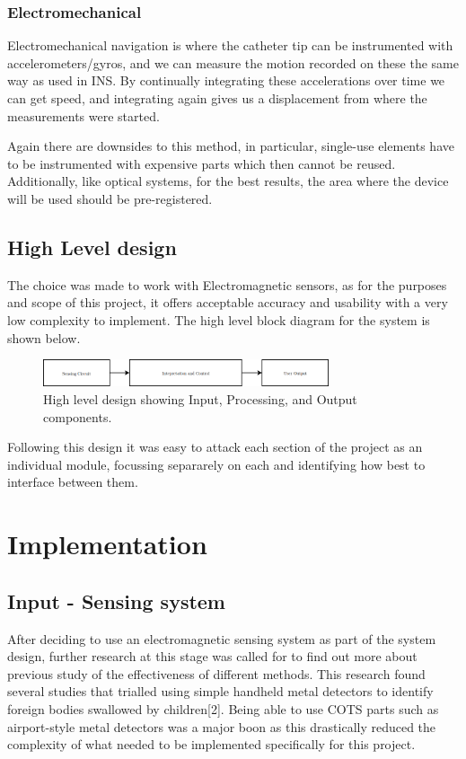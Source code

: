 \documentclass[a4paper]{article}
\begin{document}
            \subsubsection{Electromechanical}
            Electromechanical navigation is where the catheter tip can be instrumented with accelerometers/gyros, and we can measure the motion recorded on these the same way as used in INS. By continually integrating these accelerations over time we can get speed, and integrating again gives us a displacement from where the measurements were started.

            Again there are downsides to this method, in particular, single-use elements have to be instrumented with expensive parts which then cannot be reused. Additionally, like optical systems, for the best results, the area where the device will be used should be pre-registered.

        \subsection{High Level design}
        The choice was made to work with Electromagnetic sensors, as for the purposes and scope of this project, it offers acceptable accuracy and usability with a very low complexity to implement. The high level block diagram for the system is shown below.
        \begin{figure}[h]
            \centering
            \includegraphics[width=0.75\textwidth]{images/highlevel}
            \caption{High level design showing Input, Processing, and Output components.}
        \end{figure}

        Following this design it was easy to attack each section of the project as an individual module, focussing separarely on each and identifying how best to interface between them.

    \section{Implementation}
        \subsection{Input - Sensing system}
        After deciding to use an electromagnetic sensing system as part of the system design, further research at this stage was called for to find out more about previous study of the effectiveness of different methods.
        This research found several studies that trialled using simple handheld metal detectors to identify foreign bodies swallowed by children[2].
        Being able to use COTS parts such as airport-style metal detectors was a major boon as this drastically reduced the complexity of what needed to be implemented specifically for this project.
\end{document}
